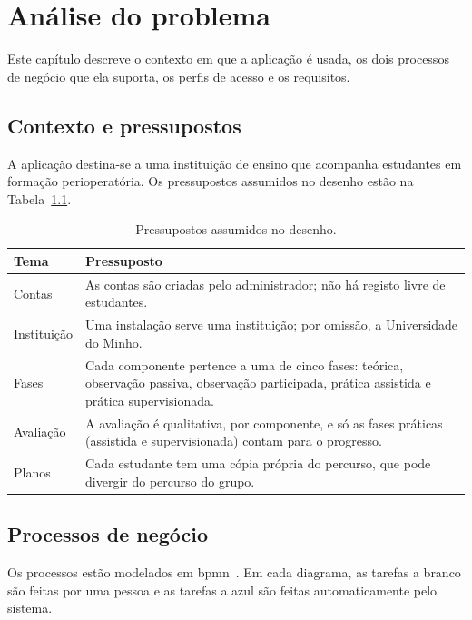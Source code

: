 \chapter{Análise do problema}
\label{cap:analise}

Este capítulo descreve o contexto em que a aplicação é usada, os dois processos de negócio que ela suporta, os perfis de acesso e os requisitos.

\section{Contexto e pressupostos}

A aplicação destina-se a uma instituição de ensino que acompanha estudantes em formação perioperatória. Os pressupostos assumidos no desenho estão na Tabela~\ref{tab:pressupostos}.

\begin{table}[H]
    \centering
    \small
    \begin{tabularx}{\linewidth}{lX}
        \toprule
        \textbf{Tema} & \textbf{Pressuposto} \\
        \midrule
        Contas & As contas são criadas pelo administrador; não há registo livre de estudantes. \\
        \midrule
        Instituição & Uma instalação serve uma instituição; por omissão, a Universidade do Minho. \\
        \midrule
        Fases & Cada componente pertence a uma de cinco fases: teórica, observação passiva, observação participada, prática assistida e prática supervisionada. \\
        \midrule
        Avaliação & A avaliação é qualitativa, por componente, e só as fases práticas (assistida e supervisionada) contam para o progresso. \\
        \midrule
        Planos & Cada estudante tem uma cópia própria do percurso, que pode divergir do percurso do grupo. \\
        \bottomrule
    \end{tabularx}
    \caption{Pressupostos assumidos no desenho.}
    \label{tab:pressupostos}
\end{table}

\section{Processos de negócio}

Os processos estão modelados em \gls{bpmn}~\citep{omg-bpmn}. Em cada diagrama, as tarefas a branco são feitas por uma pessoa e as tarefas a azul são feitas automaticamente pelo sistema.

